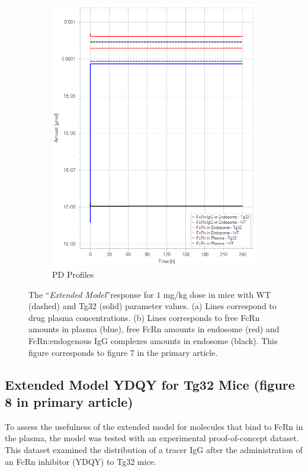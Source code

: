 \documentclass[fleqn,10pt]{physiome}
\begin{document}
\begin{figure}[htb]
\begin{subfigure}{0.49\textwidth}
        \includegraphics[width=\textwidth]{pl10.png}
        \caption{PD Profiles}
        \label{fig:6b}
    \end{subfigure}
    \caption{The ``\textit{Extended Model}''response for $1$ mg/kg dose in mice with WT (dashed) and Tg32 (solid) parameter values. (a) Lines correspond to drug plasma concentrations. (b) Lines corresponds to free FcRn amounts in plasma (blue), free FcRn amounts in endosome (red) and FcRn:endogenous IgG complexes amounts in endosome (black). This figure corresponds to figure 7 in the primary article.}
    \label{fig:6}
\end{figure}



\subsection{Extended Model YDQY for Tg32 Mice (figure 8 in primary article)}\label{Figure8}

To assess the usefulness of the extended model for molecules that bind to FcRn in the plasma, the model was tested with an experimental proof-of-concept dataset. This dataset examined the distribution of a tracer IgG after the administration of an FcRn inhibitor (YDQY) to Tg32 mice.
\end{document}
